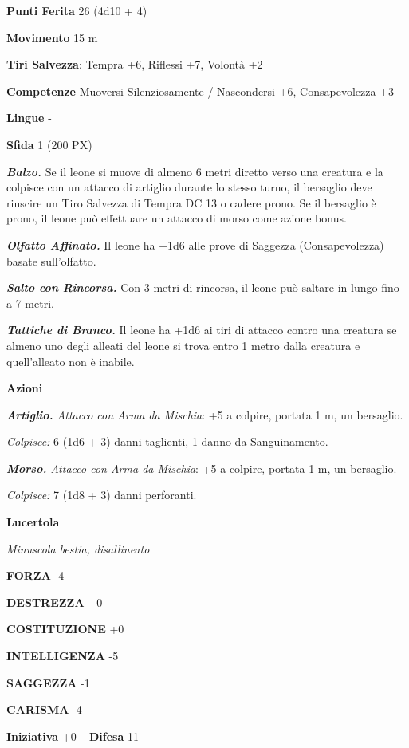 \begin{multicols}{2}
	\textbf{Punti Ferita} 26 (4d10 + 4)

	\textbf{Movimento} 15 m

	\textbf{Tiri Salvezza}: Tempra +6, Riflessi +7, Volontà +2

	\textbf{Competenze} Muoversi Silenziosamente / Nascondersi +6, Consapevolezza +3

	\textbf{Lingue} -

	\textbf{Sfida} 1 (200 PX)

	\textit{\textbf{Balzo.}} Se il leone si muove di almeno 6 metri diretto verso una creatura e la colpisce con un attacco di artiglio durante lo stesso turno, il bersaglio deve riuscire un Tiro Salvezza di Tempra DC 13 o cadere prono. Se il bersaglio è prono, il leone può effettuare un
	attacco di morso come azione bonus.

	\textit{\textbf{Olfatto Affinato.}} Il leone ha +1d6 alle prove di Saggezza (Consapevolezza) basate sull'olfatto.

	\textit{\textbf{Salto con Rincorsa.}} Con 3 metri di rincorsa, il leone può saltare in lungo fino a 7 metri.

	\textit{\textbf{Tattiche di Branco.}} Il leone ha +1d6 ai tiri di attacco contro una creatura se almeno uno degli alleati del leone si trova entro 1 metro dalla creatura e quell'alleato non è inabile.

	\textbf{Azioni}

	\textit{\textbf{Artiglio.} Attacco con Arma da Mischia}: +5 a colpire, portata 1 m, un bersaglio.

	\textit{Colpisce:} 6 (1d6 + 3) danni taglienti, 1 danno da Sanguinamento.

	\textit{\textbf{Morso.} Attacco con Arma da Mischia}: +5 a colpire, portata 1 m, un bersaglio.

	\textit{Colpisce:} 7 (1d8 + 3) danni perforanti.

	\medskip\textbf{Lucertola}

	\textit{Minuscola bestia, disallineato}

	\textbf{FORZA} -4

	\textbf{DESTREZZA} +0

	\textbf{COSTITUZIONE} +0

	\textbf{INTELLIGENZA} -5

	\textbf{SAGGEZZA} -1

	\textbf{CARISMA} -4

	\textbf{Iniziativa} +0 -- \textbf{Difesa} 11


\end{multicols}
